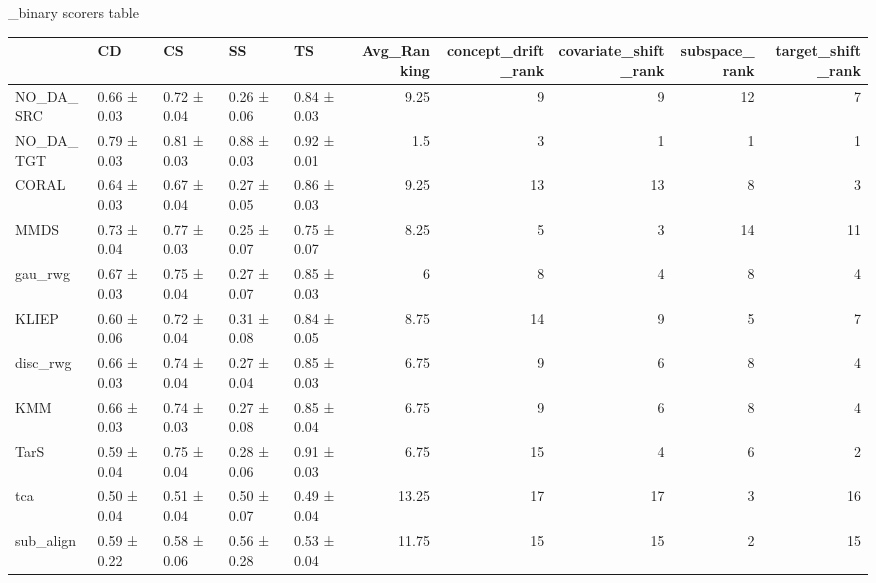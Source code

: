 \sectionsimulated_binary
\subsectionOther scorers table\begin{tabular}{lllllrrrrr}
\hline
           & CD          & CS          & SS          & TS          &   Avg\_Ranking &   concept\_drift\_rank &   covariate\_shift\_rank &   subspace\_rank &   target\_shift\_rank \\
\hline
 NO\_DA\_SRC & 0.66 ± 0.03 & 0.72 ± 0.04 & 0.26 ± 0.06 & 0.84 ± 0.03 &          9.25 &                    9 &                      9 &              12 &                   7 \\
 NO\_DA\_TGT & 0.79 ± 0.03 & 0.81 ± 0.03 & 0.88 ± 0.03 & 0.92 ± 0.01 &          1.5  &                    3 &                      1 &               1 &                   1 \\
 CORAL     & 0.64 ± 0.03 & 0.67 ± 0.04 & 0.27 ± 0.05 & 0.86 ± 0.03 &          9.25 &                   13 &                     13 &               8 &                   3 \\
 MMDS      & 0.73 ± 0.04 & 0.77 ± 0.03 & 0.25 ± 0.07 & 0.75 ± 0.07 &          8.25 &                    5 &                      3 &              14 &                  11 \\
 gau\_rwg   & 0.67 ± 0.03 & 0.75 ± 0.04 & 0.27 ± 0.07 & 0.85 ± 0.03 &          6    &                    8 &                      4 &               8 &                   4 \\
 KLIEP     & 0.60 ± 0.06 & 0.72 ± 0.04 & 0.31 ± 0.08 & 0.84 ± 0.05 &          8.75 &                   14 &                      9 &               5 &                   7 \\
 disc\_rwg  & 0.66 ± 0.03 & 0.74 ± 0.04 & 0.27 ± 0.04 & 0.85 ± 0.03 &          6.75 &                    9 &                      6 &               8 &                   4 \\
 KMM       & 0.66 ± 0.03 & 0.74 ± 0.03 & 0.27 ± 0.08 & 0.85 ± 0.04 &          6.75 &                    9 &                      6 &               8 &                   4 \\
 TarS      & 0.59 ± 0.04 & 0.75 ± 0.04 & 0.28 ± 0.06 & 0.91 ± 0.03 &          6.75 &                   15 &                      4 &               6 &                   2 \\
 tca       & 0.50 ± 0.04 & 0.51 ± 0.04 & 0.50 ± 0.07 & 0.49 ± 0.04 &         13.25 &                   17 &                     17 &               3 &                  16 \\
 sub\_align & 0.59 ± 0.22 & 0.58 ± 0.06 & 0.56 ± 0.28 & 0.53 ± 0.04 &         11.75 &                   15 &                     15 &               2 &                  15 \\

\end{tabular}
